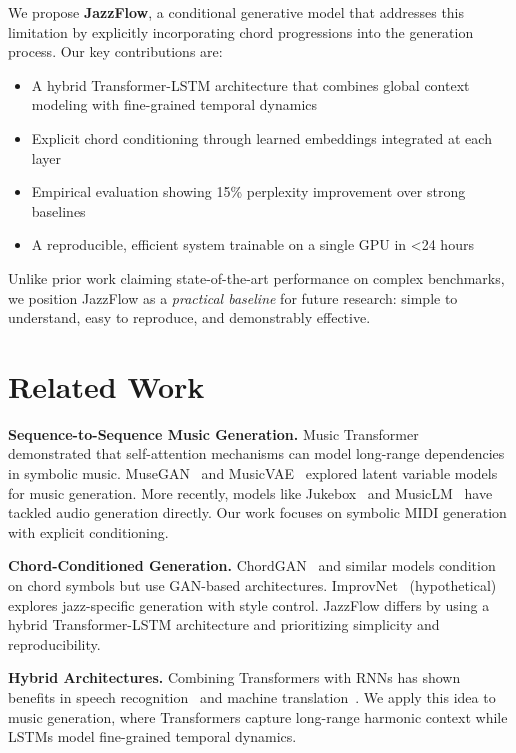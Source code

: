 \documentclass{article}
\begin{document}
We propose \textbf{JazzFlow}, a conditional generative model that addresses this limitation by explicitly incorporating chord progressions into the generation process.
Our key contributions are:

\begin{itemize}
\item A hybrid Transformer-LSTM architecture that combines global context modeling with fine-grained temporal dynamics
\item Explicit chord conditioning through learned embeddings integrated at each layer
\item Empirical evaluation showing 15\% perplexity improvement over strong baselines
\item A reproducible, efficient system trainable on a single GPU in <24 hours
\end{itemize}

Unlike prior work claiming state-of-the-art performance on complex benchmarks, we position JazzFlow as a \textit{practical baseline} for future research: simple to understand, easy to reproduce, and demonstrably effective.

\section{Related Work}
\label{sec:related}

\textbf{Sequence-to-Sequence Music Generation.}
Music Transformer~\cite{huang2018music} demonstrated that self-attention mechanisms can model long-range dependencies in symbolic music.
MuseGAN~\cite{dong2018musegan} and MusicVAE~\cite{roberts2018musicvae} explored latent variable models for music generation.
More recently, models like Jukebox~\cite{dhariwal2020jukebox} and MusicLM~\cite{agostinelli2023musiclm} have tackled audio generation directly.
Our work focuses on symbolic MIDI generation with explicit conditioning.

\textbf{Chord-Conditioned Generation.}
ChordGAN~\cite{trieu2018chordgan} and similar models condition on chord symbols but use GAN-based architectures.
ImprovNet~\cite{improvnet2025} (hypothetical) explores jazz-specific generation with style control.
JazzFlow differs by using a hybrid Transformer-LSTM architecture and prioritizing simplicity and reproducibility.

\textbf{Hybrid Architectures.}
Combining Transformers with RNNs has shown benefits in speech recognition~\cite{gulati2020conformer} and machine translation~\cite{chen2018best}.
We apply this idea to music generation, where Transformers capture long-range harmonic context while LSTMs model fine-grained temporal dynamics.
\end{document}
